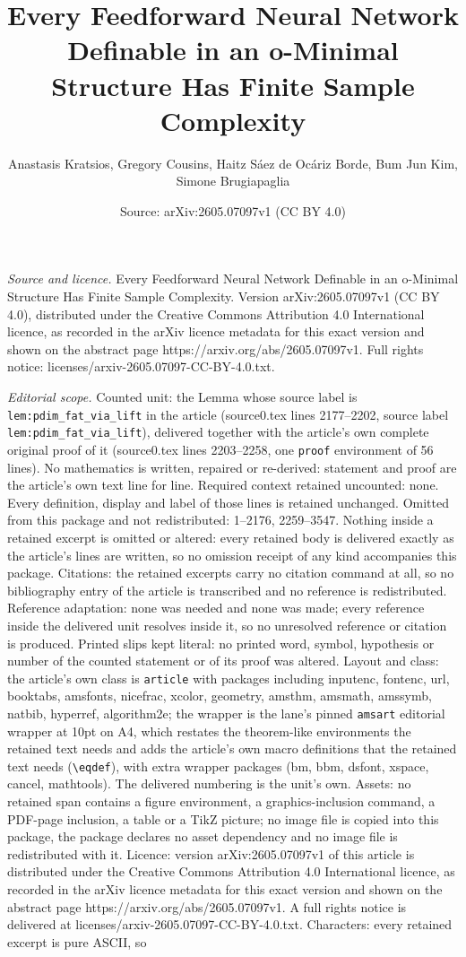 \documentclass[10pt,a4paper]{amsart}
\title[Every Feedforward Neural Network Definable in an o-Minimal S]{Every Feedforward Neural Network Definable in an o-Minimal Structure Has Finite Sample Complexity}
\author{Anastasis Kratsios, Gregory Cousins, Haitz S\'aez de Oc\'ariz Borde, Bum Jun Kim, Simone Brugiapaglia}
\date{Source: arXiv:2605.07097v1 (CC BY 4.0)}
\begin{document}
\maketitle

\noindent\emph{Source and licence.} Every Feedforward Neural Network Definable in an o-Minimal Structure Has Finite Sample Complexity. Version arXiv:2605.07097v1 (CC BY 4.0), distributed under the Creative Commons Attribution 4.0 International licence, as recorded in the arXiv licence metadata for this exact version and shown on the abstract page https://arxiv.org/abs/2605.07097v1. Full rights notice: licenses/arxiv-2605.07097-CC-BY-4.0.txt.\par\smallskip

\noindent\textit{Editorial scope.} Counted unit: the Lemma whose source label is \texttt{lem:pdim\_fat\_via\_lift} in the article (source0.tex lines 2177--2202, source label \texttt{lem:pdim\_fat\_via\_lift}), delivered together with the article's own complete original proof of it (source0.tex lines 2203--2258, one \texttt{proof} environment of 56 lines). No mathematics is written, repaired or re-derived: statement and proof are the article's own text line for line. Required context retained uncounted: none. Every definition, display and label of those lines is retained unchanged. Omitted from this package and not redistributed: 1--2176, 2259--3547. Nothing inside a retained excerpt is omitted or altered: every retained body is delivered exactly as the article's lines are written, so no omission receipt of any kind accompanies this package. Citations: the retained excerpts carry no citation command at all, so no bibliography entry of the article is transcribed and no reference is redistributed. Reference adaptation: none was needed and none was made; every reference inside the delivered unit resolves inside it, so no unresolved reference or citation is produced. Printed slips kept literal: no printed word, symbol, hypothesis or number of the counted statement or of its proof was altered. Layout and class: the article's own class is \texttt{article} with packages including inputenc, fontenc, url, booktabs, amsfonts, nicefrac, xcolor, geometry, amsthm, amsmath, amssymb, natbib, hyperref, algorithm2e; the wrapper is the lane's pinned \texttt{amsart} editorial wrapper at 10pt on A4, which restates the theorem-like environments the retained text needs and adds the article's own macro definitions that the retained text needs (\texttt{\textbackslash eqdef}), with extra wrapper packages (bm, bbm, dsfont, xspace, cancel, mathtools). The delivered numbering is the unit's own. Assets: no retained span contains a figure environment, a graphics-inclusion command, a PDF-page inclusion, a table or a TikZ picture; no image file is copied into this package, the package declares no asset dependency and no image file is redistributed with it. Licence: version arXiv:2605.07097v1 of this article is distributed under the Creative Commons Attribution 4.0 International licence, as recorded in the arXiv licence metadata for this exact version and shown on the abstract page https://arxiv.org/abs/2605.07097v1. A full rights notice is delivered at licenses/arxiv-2605.07097-CC-BY-4.0.txt. Characters: every retained excerpt is pure ASCII, so 
\end{document}
